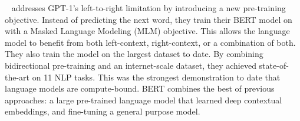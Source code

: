 ~\cite{DBLP:journals/corr/abs-1810-04805} addresses GPT-1’s left-to-right limitation by introducing a new pre-training objective.
Instead of predicting the next word, they train their BERT model on with a Masked Language Modeling (MLM) objective.
This allows the language model to benefit from both left-context, right-context, or a combination of both.
They also train the model on the largest dataset to date.
By combining bidirectional pre-training and an internet-scale dataset, they achieved state-of-the-art on 11 NLP tasks.
This was the strongest demonstration to date that language models are compute-bound.
BERT combines the best of previous approaches: a large pre-trained language model that learned deep contextual embeddings, and fine-tuning a general purpose model.















